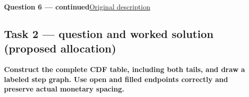 \par\vspace{3mm}\secInicio[][sec:q6]

\clearpage
\textbf{Question 6 --- continued}\quad\hyperref[sec:q6]{Original description}

\subsection*{Task 2 --- question and worked solution (proposed allocation) }
\label{sol:q6t2}

\noindent\textbf{\boldmath Construct the complete CDF table, including both tails, and draw a labeled step graph. Use open and filled endpoints correctly and preserve actual monetary spacing.}\par\nopagebreak

